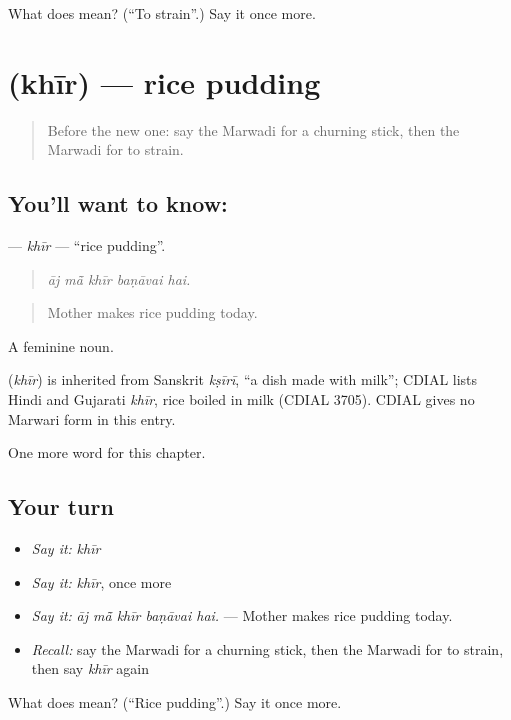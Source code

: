 \begin{tcolorbox}[breakable,colback=teal!4,colframe=teal!35!black,title={Before you move on}]
What does  mean? (\textquotedblleft{}To strain\textquotedblright{}.) Say it once more.
\end{tcolorbox}
\section[\texorpdfstring{\mw{खीर} (khīr)}{खीर (khīr)}]{ (khīr) — rice pudding}

\label{lesson:MW-C181-khir}



\begin{quote}
Before the new one: say the Marwadi for a churning stick, then the Marwadi for to strain.
\end{quote}

\subsection*{You'll want to know: }
\textbf{} — \emph{khīr} — \textquotedblleft{}rice pudding\textquotedblright{}.

\begin{quote}
    
\end{quote}

\begin{quote}
\emph{āj mā̃ khīr baṇāvai hai.}
\end{quote}

\begin{quote}
Mother makes rice pudding today.
\end{quote}

A feminine noun.

\begin{cousinweb}
\textbf{} (\emph{khīr}) is inherited from Sanskrit \emph{kṣīrī}, \textquotedblleft{}a dish made with milk\textquotedblright{}; CDIAL lists Hindi and Gujarati \emph{khīr}, rice boiled in milk (CDIAL 3705). CDIAL gives no Marwari form in this entry.
\end{cousinweb}

\begin{grammarlens}[title={What you've built}]
One more word for this chapter.
\end{grammarlens}

\subsection*{Your turn}
\begin{itemize}
\raggedright
  \item \emph{Say it:} \emph{khīr}
  \item \emph{Say it:} \emph{khīr}, once more
  \item \emph{Say it:} \emph{āj mā̃ khīr baṇāvai hai.} — Mother makes rice pudding today.
  \item \emph{Recall:} say the Marwadi for a churning stick, then the Marwadi for to strain, then say \emph{khīr} again
\end{itemize}

\begin{tcolorbox}[breakable,colback=teal!4,colframe=teal!35!black,title={Before you move on}]
What does  mean? (\textquotedblleft{}Rice pudding\textquotedblright{}.) Say it once more.
\end{tcolorbox}
